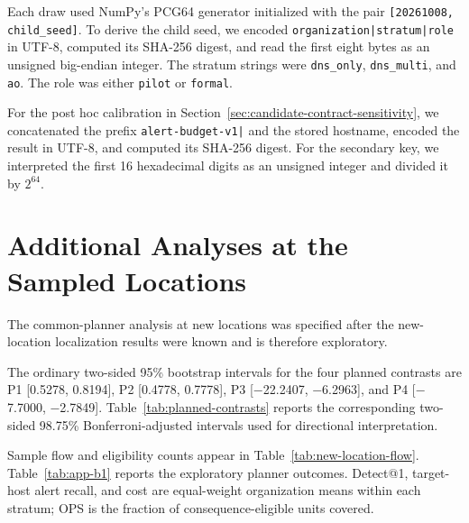 \documentclass[sn-basic]{sn-jnl}%
\theoremstyle{thmstyleone}%
\theoremstyle{thmstyletwo}%
\theoremstyle{thmstylethree}%
\begin{document}
\begin{appendices}
Each draw used NumPy's PCG64 generator initialized with the pair \texttt{[20261008, child\_seed]}. To derive the child seed, we encoded \verb!organization|stratum|role! in UTF-8, computed its SHA-256 digest, and read the first eight bytes as an unsigned big-endian integer. The stratum strings were \texttt{dns\_only}, \texttt{dns\_multi}, and \texttt{ao}. The role was either \texttt{pilot} or \texttt{formal}.

For the post hoc calibration in Section~\ref{sec:candidate-contract-sensitivity}, we concatenated the prefix \verb!alert-budget-v1|! and the stored hostname, encoded the result in UTF-8, and computed its SHA-256 digest. For the secondary key, we interpreted the first 16 hexadecimal digits as an unsigned integer and divided it by \(2^{64}\).

\section{Additional Analyses at the Sampled Locations}\label{app:b}

\setcounter{table}{0}

The common-planner analysis at new locations was specified after the new-location localization results were known and is therefore exploratory.

The ordinary two-sided 95\% bootstrap intervals for the four planned contrasts are P1 [0.5278, 0.8194], P2 [0.4778, 0.7778], P3 [\ensuremath{-}22.2407, \ensuremath{-}6.2963], and P4 [\ensuremath{-}7.7000, \ensuremath{-}2.7849]. Table~\ref{tab:planned-contrasts} reports the corresponding two-sided 98.75\% Bonferroni-adjusted intervals used for directional interpretation.

Sample flow and eligibility counts appear in Table~\ref{tab:new-location-flow}. Table~\ref{tab:app-b1} reports the exploratory planner outcomes. Detect@1, target-host alert recall, and cost are equal-weight organization means within each stratum; OPS is the fraction of consequence-eligible units covered.


\end{appendices}
\end{document}
